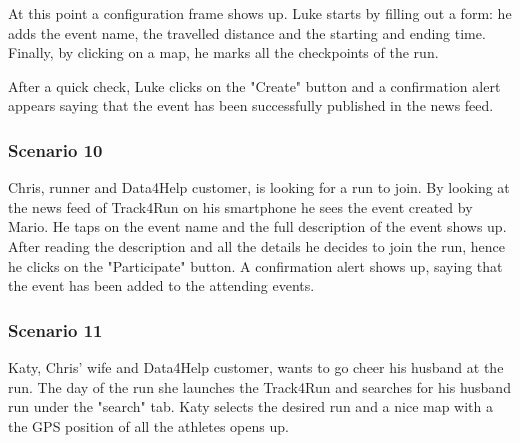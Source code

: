 At this point a configuration frame shows up. Luke starts by filling out a form: he adds the event name, the travelled distance and the starting and ending time. Finally, by clicking on a map, he marks all the checkpoints of the run.

After a quick check, Luke clicks on the "Create" button and a confirmation alert appears saying that the event has been successfully published in the news feed.

\subsubsection{Scenario 10}
Chris, runner and Data4Help customer, is looking for a run to join. By looking at the  news feed of Track4Run on his smartphone he sees the event created by Mario. He taps on the event name and the full description of the event shows up. After reading the description and all the details he decides to join the run, hence he clicks on the "Participate" button. A confirmation alert shows up, saying that the event has been added to the attending events.
\subsubsection{Scenario 11}
Katy, Chris' wife and Data4Help customer,  wants to go cheer his husband at the run. The day of the run she launches the Track4Run and searches for his husband run under the "search" tab. Katy selects the desired run and a nice map with a the GPS position of all the athletes opens up.
 

